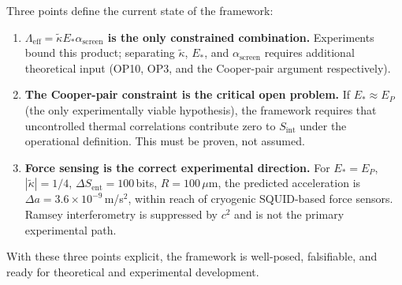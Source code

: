 \documentclass[11pt]{article}
\begin{document}
Three points define the current state of the framework:
\begin{enumerate}
\item \textbf{$\Lambda_{\mathrm{eff}} = \tilde{\kappa}E_*\alpha_{\mathrm{screen}}$ is the only constrained combination.}
  Experiments bound this product; separating $\tilde{\kappa}$, $E_*$, and $\alpha_{\mathrm{screen}}$
  requires additional theoretical input (OP10, OP3, and the Cooper-pair argument respectively).

\item \textbf{The Cooper-pair constraint is the critical open problem.}
  If $E_* \approx E_P$ (the only experimentally viable hypothesis), the framework requires
  that uncontrolled thermal correlations contribute zero to $S_{\mathrm{int}}$ under the
  operational definition. This must be proven, not assumed.

\item \textbf{Force sensing is the correct experimental direction.}
  For $E_* = E_P$, $|\tilde{\kappa}| = 1/4$, $\Delta S_{\mathrm{ent}} = 100$\,bits, $R = 100\,\mu$m,
  the predicted acceleration is $\Delta a = 3.6\times10^{-9}$\,m/s$^2$, within reach of
  cryogenic SQUID-based force sensors. Ramsey interferometry is suppressed by $c^2$ and
  is not the primary experimental path.
\end{enumerate}

With these three points explicit, the framework is well-posed, falsifiable, and ready for
theoretical and experimental development.
\end{document}
